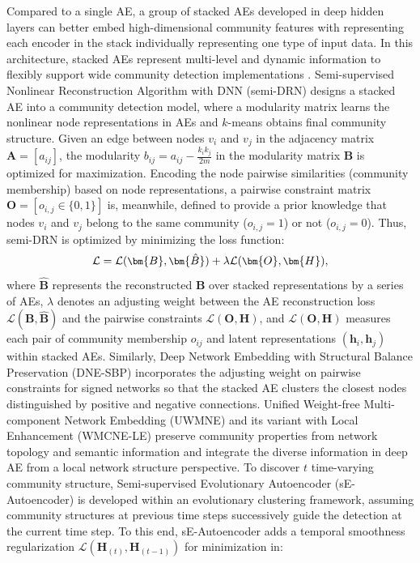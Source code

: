 \label{sec-stacked-ae}
Compared to a single AE, a group of stacked AEs developed in deep hidden layers can better embed high-dimensional community features with representing each encoder in the stack individually representing one type of input data. In this architecture, stacked AEs represent multi-level and dynamic information to flexibly support wide community detection implementations .
Semi-supervised Nonlinear Reconstruction Algorithm with DNN (semi-DRN)  designs a stacked AE into a community detection model, where a modularity matrix learns the nonlinear node representations in AEs and $k$-means obtains final community structure. Given an edge between nodes $v_i$ and $v_j$ in the adjacency matrix $\bm{A}=[a_{ij}]$, the modularity  $b_{ij} = a_{ij} - \frac{k_i k_j}{2m}$ in the modularity matrix $\bm{B}$ is optimized for maximization. Encoding the node pairwise similarities (community membership) based on node representations, a pairwise constraint matrix $\bm{O} = [o_{i,j}\in \{0,1\}]$ is, meanwhile, defined to provide a prior knowledge that nodes $v_i$ and $v_j$ belong to the same community ($o_{i,j} = 1$) or not ($o_{i,j} = 0$). Thus, semi-DRN is optimized by minimizing the loss function:
\begin{equation}
\small
\mathcal{L} = \mathcal{L}(\bm{B}, \bm{\hat{B}}) + \lambda \mathcal{L}(\bm{O},\bm{H}), 
\end{equation}
where $\bm{\hat{B}}$ represents the reconstructed $\bm{B}$ over stacked representations by a series of AEs, $\lambda$ denotes an adjusting weight between the AE reconstruction loss $\mathcal{L}(\bm{B}, \bm{\hat{B}})$ and the pairwise constraints $\mathcal{L}(\bm{O},\bm{H})$, and $\mathcal{L}(\bm{O},\bm{H})$ measures each pair of community membership $o_{ij}$ and latent representations $(\bm{h}_i,\bm{h}_j)$ within stacked AEs. 
Similarly, Deep Network Embedding with Structural Balance Preservation (DNE-SBP)  incorporates the adjusting weight on pairwise constraints for signed networks so that the stacked AE clusters the closest nodes distinguished by positive and negative connections. Unified Weight-free Multi-component Network Embedding (UWMNE) and its variant with Local Enhancement (WMCNE-LE)  preserve community properties from network topology and semantic information and integrate the diverse information in deep AE from a local network structure perspective.
To discover $t$ time-varying community structure, Semi-supervised Evolutionary Autoencoder (sE-Autoencoder)  is developed within an evolutionary clustering framework, assuming community structures at previous time steps successively guide the detection at the current time step. To this end, sE-Autoencoder adds a temporal smoothness regularization $\mathcal{L}(\bm{H}_{(t)}, \bm{H}_{(t-1)})$ for minimization  in:
